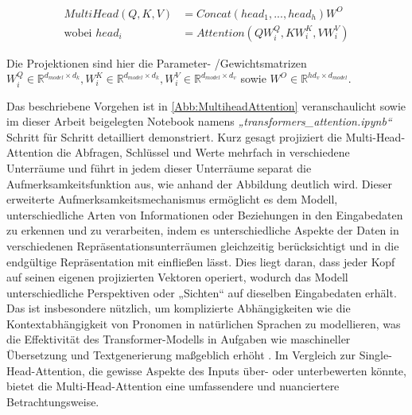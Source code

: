 \begin{equation}\label{eq:multiheadattention}
	\begin{aligned}
		MultiHead(Q,K,V) &= Concat(head_1, ..., head_h)W^O\\
		\text{wobei } head_i &= Attention(QW_i^Q, KW_i^K, VW_i^V)
	\end{aligned}
\end{equation}

Die Projektionen sind hier die Parameter- /Gewichtsmatrizen $W_i^Q\in \mathbb{R}^{d_{model}\times d_k}, W_i^K\in \mathbb{R}^{d_{model}\times d_k}, W_i^V\in \mathbb{R}^{d_{model}\times d_v}$ sowie $W^O\in \mathbb{R}^{h d_v\times d_{model}}$.

Das beschriebene Vorgehen ist in \cref{Abb:MultiheadAttention} veranschaulicht sowie im dieser Arbeit beigelegten Notebook namens \emph{„transformers\_attention.ipynb“} Schritt für Schritt detailliert demonstriert. Kurz gesagt projiziert die Multi-Head-Attention die Abfragen, Schlüssel und Werte mehrfach in verschiedene Unterräume und führt in jedem dieser Unterräume separat die Aufmerksamkeitsfunktion aus, wie anhand der Abbildung deutlich wird. Dieser erweiterte Aufmerksamkeitsmechanismus ermöglicht es dem Modell, unterschiedliche Arten von Informationen oder Beziehungen in den Eingabedaten zu erkennen und zu verarbeiten, indem es unterschiedliche Aspekte der Daten in verschiedenen Repräsentationsunterräumen gleichzeitig berücksichtigt und in die endgültige Repräsentation mit einfließen lässt. Dies liegt daran, dass jeder Kopf auf seinen eigenen projizierten Vektoren operiert, wodurch das Modell unterschiedliche Perspektiven oder „Sichten“ auf dieselben Eingabedaten erhält. Das ist insbesondere nützlich, um komplizierte Abhängigkeiten wie die Kontextabhängigkeit von Pronomen in natürlichen Sprachen zu modellieren, was die Effektivität des Transformer-Modells in Aufgaben wie maschineller Übersetzung und Textgenerierung maßgeblich erhöht \cite{BERT}\cite{WNLI}. Im Vergleich zur Single-Head-Attention, die gewisse Aspekte des Inputs über- oder unterbewerten könnte, bietet die Multi-Head-Attention eine umfassendere und nuanciertere Betrachtungsweise.

